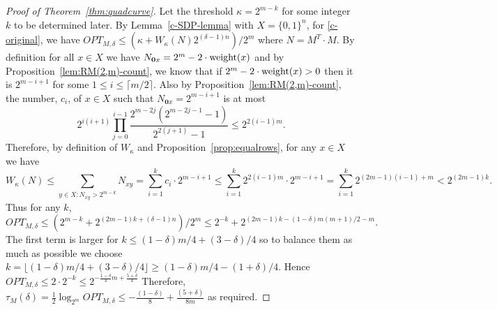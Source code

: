 
\begin{proof}[Proof of Theorem~\ref{thm:quadcurve}]
Let the threshold $\kappa=2^{m-k}$ for some integer $k$ to be determined later.
By Lemma~\ref{c-SDP-lemma} with $X=\{0,1\}^n$, for \eqref{c-original}, we have
$OPT_{M,\delta}\le (\kappa+W_\kappa(N) 2^{(\delta-1)n})/2^m$ where
$N=M^T\cdot M$.
By definition for all $x\in X$ we have $N_{\mathbf{0}x}=2^m-2\cdot \textrm{weight}(x)$
and by Proposition~\ref{lem:RM(2,m)-count}, we know that if $2^m-2\cdot \textrm{weight}(x)>0$
then it is $2^{m-i+1}$ for some $1\le i\le \lceil m/2\rceil$.
Also by Proposition~\ref{lem:RM(2,m)-count}, the number, $c_i$, of $x\in X$
such that $N_{\mathbf{0}x}=2^{m-i+1}$ is at most
$$2^{i(i+1)} \prod_{j=0}^{i-1} \frac{2^{m-2j}(2^{m-2j-1}-1)}{2^{2(j+1)}-1}
\le 2^{2(i-1)m}.$$
Therefore, by definition
of $W_\kappa$ and Proposition~\ref{prop:equalrows}, for any $x\in X$ 
we have 
\begin{equation*}
W_\kappa(N)
\le \sum_{y\in X: N_{xy}> 2^{m-k}} N_{xy}
=\sum_{i=1}^{k}  c_i\cdot 2^{m-i+1} 
\le \sum_{i=1}^{k} 2^{2(i-1)m}\cdot 2^{m-i+1}
=\sum_{i=1}^{k} 2^{(2m-1)(i-1)+m}
< 2^{(2m-1)k}.
\end{equation*}
Thus for any $k$,
$$OPT_{M,\delta}\le (2^{m-k}+2^{(2m-1)k+(\delta-1)n})/2^m\le 2^{-k}+2^{(2m-1)k-(1-\delta)m(m+1)/2-m}.$$
The first term is larger for $k\le (1-\delta) m/4 + (3-\delta)/4$ so to balance
them as much as possible we choose
$k=\lfloor (1-\delta) m/4 + (3-\delta)/4\rfloor\ge (1-\delta)m/4 -(1+\delta)/4$.
Hence $OPT_{M,\delta}\le 2\cdot 2^{-k} \le 2^{-\frac {1-\delta}4 m +\frac{5+\delta}4}$
Therefore,
$\tau_M(\delta)=\frac12 \log_{2^m} OPT_{M,\delta}\le -\frac{(1-\delta)}8+\frac{(5+\delta)}{8m}$ as required. 
\end{proof}



